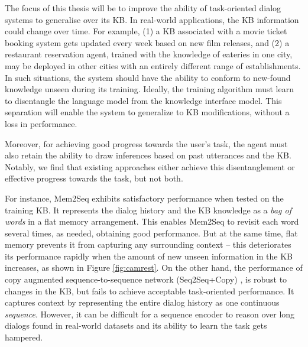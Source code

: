 

The focus of this thesis will be to improve the ability of task-oriented dialog systems to generalise over its KB.
In real-world applications, the KB information could change over time. For example, (1) a KB associated with a movie ticket booking system gets updated every week based on new film releases, and (2) a restaurant reservation agent, trained with the knowledge of eateries in one city, may be deployed in other cities with an entirely different range of establishments. In such situations, the system should have the ability to conform to new-found knowledge unseen during its training. Ideally, the training algorithm must learn to disentangle the language model from the knowledge interface model. This separation will enable the system to generalize to KB modifications, without a loss in performance.  

Moreover, for achieving good progress towards the user's task, the agent must also retain the ability to draw inferences based on past utterances and the KB. Notably, we find that existing approaches either achieve this disentanglement or effective progress towards the task, but not both.  

For instance, Mem2Seq \cite{mem2seq} exhibits satisfactory performance when tested on the training KB. It represents the dialog history and the KB knowledge as a \emph{bag of words} in a flat memory arrangement. This enables Mem2Seq to revisit each word several times, as needed, obtaining good performance. But at the same time, flat memory prevents it from capturing any surrounding context -- this deteriorates its performance rapidly when the amount of new unseen information in the KB increases, as shown in Figure \ref{fig:camrest}. On the other hand, the performance of copy augmented sequence-to-sequence network (Seq2Seq+Copy) \cite{eric2017copy}, is robust to changes in the KB, but fails to achieve acceptable task-oriented performance. It captures context by representing the entire dialog history as one continuous \emph{sequence}.
However, it can be difficult for a sequence encoder to reason over long dialogs found in real-world datasets and its ability to learn the task gets hampered.  

